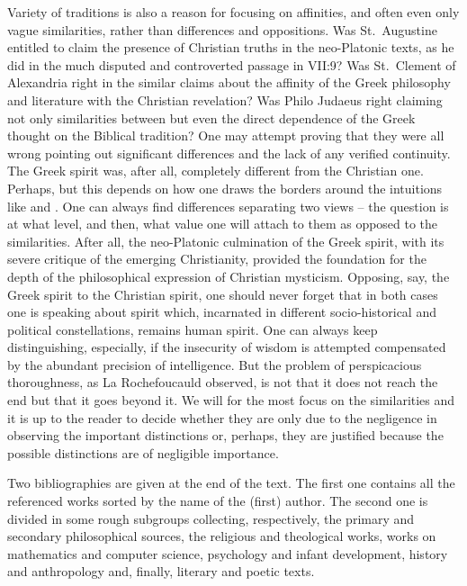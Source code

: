 Variety of traditions is also a reason for focusing on affinities, and often
even only vague similarities, rather than differences and oppositions.  Was
St.~Augustine entitled to claim the presence of Christian truths in the
neo-Platonic texts, as he did in the much disputed and controverted passage in
 VII:9? Was St.~Clement of Alexandria right in the similar
claims about the affinity of the Greek philosophy and literature with the
Christian revelation? Was Philo Judaeus right claiming not only similarities
between but even the direct dependence of the Greek thought on the Biblical
tradition?  One may attempt proving that they were all wrong pointing out
significant differences and the lack of any verified continuity. The Greek
spirit was, after all, completely different from the Christian one.  Perhaps,
but this depends on how one draws the borders around the intuitions like
 and .  One can always
find differences separating two views -- the question is at what level, and
then, what value one will attach to them as opposed to the similarities. After
all, the neo-Platonic culmination of the Greek spirit, with its severe critique 
of the emerging Christianity, provided the foundation for the depth of the
philosophical expression of Christian mysticism.  Opposing, say, the Greek
spirit to the Christian spirit, one should never forget that in both cases one
is speaking about spirit which, incarnated in different socio-historical and
political constellations, remains human spirit.  One can always
keep distinguishing, especially, if the insecurity of wisdom is attempted
compensated by the abundant precision of intelligence.  But the problem of
perspicacious thoroughness, as La Rochefoucauld observed, is not that it does
not reach the end but that it goes beyond it.
We will for the most focus on the similarities and it is up to the reader 
to decide whether they are only due to the negligence in observing the important
distinctions or, perhaps, they are justified because the possible distinctions
are of negligible importance.

 Two bibliographies are given at the end of the
text. The first one contains all the referenced works sorted by the name of the
(first) author. The second one is divided in some rough subgroups collecting,
respectively, the primary and secondary philosophical sources, the religious and
theological works, works on mathematics and computer science, psychology and
infant development, history and anthropology and, finally, literary and poetic
texts.


